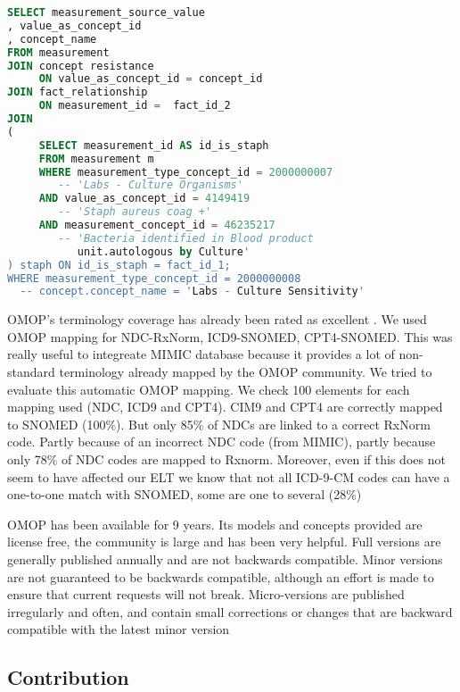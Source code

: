 \small
\begin{lstlisting}[language=sql]
SELECT measurement_source_value
, value_as_concept_id
, concept_name
FROM measurement
JOIN concept resistance 
     ON value_as_concept_id = concept_id
JOIN fact_relationship 
     ON measurement_id =  fact_id_2
JOIN
(
     SELECT measurement_id AS id_is_staph
     FROM measurement m
     WHERE measurement_type_concept_id = 2000000007        			
        -- 'Labs - Culture Organisms'
     AND value_as_concept_id = 4149419                     			
        -- 'Staph aureus coag +' 
     AND measurement_concept_id = 46235217               			
        -- 'Bacteria identified in Blood product 
           unit.autologous by Culture'
) staph ON id_is_staph = fact_id_1;
WHERE measurement_type_concept_id = 2000000008        			        
  -- concept.concept_name = 'Labs - Culture Sensitivity'
\end{lstlisting}
\normalsize

OMOP's terminology coverage has already been rated as excellent \cite{omop-vs-pcornet}. 
We used OMOP mapping for NDC-RxNorm, ICD9-SNOMED, CPT4-SNOMED. 
This was really useful to integreate MIMIC database because it provides a lot 
of non-standard terminology already mapped by the OMOP community. 
We tried to evaluate this automatic OMOP mapping. We check 100 elements for each 
mapping used (NDC, ICD9 and CPT4). CIM9 and CPT4 are correctly mapped to SNOMED 
(100\%). But only 85\% of NDCs are linked to a correct RxNorm code. 
Partly because of an incorrect NDC code (from MIMIC), partly because only 78\% 
of NDC codes are mapped to Rxnorm. Moreover, even if this does not seem to have 
affected our ELT we know that not all ICD-9-CM codes can have a one-to-one match 
with SNOMED, some are one to several (28\%) \cite{snomed-icd9}
 
OMOP has been available for 9 years. Its models and concepts provided are 
license free, the community is large and has been very helpful. Full versions 
are generally published annually and are not backwards compatible. 
Minor versions are not guaranteed to be backwards compatible, although an effort 
is made to ensure that current requests will not break. Micro-versions are 
published irregularly and often, and contain small corrections or changes 
that are backward compatible with the latest minor version \cite{omop-cdm}



\subsection{Contribution}

